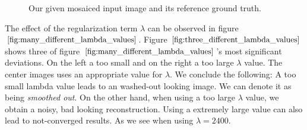 \documentclass{paper}
\begin{document}
\begin{figure}[h!]
\begin{center}

\end{center}
\caption{Our given mosaiced input image and its reference ground truth.}
\label{fig:input_and_ground_truth}
\end{figure}

The effect of the regularization term $\lambda$ can be observed in figure $\ref{fig:many_different_lambda_values}$. Figure $\ref{fig:three_different_lambda_values}$ shows three of figure $\ref{fig:many_different_lambda_values}$'s most significant deviations. On the left a too small and on the right a too large $\lambda$ value. The center images uses an appropriate value for $\lambda$. We conclude the following: A too small lambda value leads to an washed-out looking image. We can denote it as being \emph{smoothed out}. On the other hand, when using a too large $\lambda$ value, we obtain a noisy, bad looking reconstruction. Using a extremely large value can also lead to not-converged results. As we see when using $\lambda=2400$.
\end{document}
